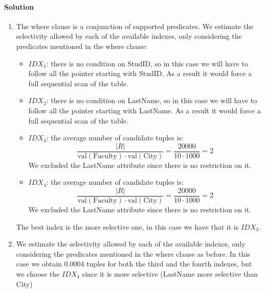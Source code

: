 \paragraph*{Solution}
\begin{enumerate}
    \item The where clause is a conjunction of supported predicates.
        We estimate the selectivity allowed by each of the available indexes, only considering the predicates mentioned in the where clause:
        \begin{itemize}
            \item $IDX_1$: there is no condition on StudID, so in this case we will have to follow all the pointer starting with StudID. 
                As a result it would force a full sequential scan of the table.
            \item $IDX_2$: there is no condition on LastName, so in this case we will have to follow all the pointer starting with LastName. 
                As a result it would force a full sequential scan of the table.
            \item $IDX_3$: the average number of candidate tuples is: 
                \[\dfrac{\left\lvert R \right\rvert }{\text{val}(\text{Faculty}) \cdot \text{val}(\text{City}) }=\dfrac{20000}{10 \cdot 1000}=2\]
                We excluded the LastName attribute since there is no restriction on it. 
            \item $IDX_4$: the average number of candidate tuples is: 
                \[\dfrac{\left\lvert R \right\rvert }{\text{val}(\text{Faculty}) \cdot \text{val}(\text{City}) }=\dfrac{20000}{10 \cdot 1000}=2\]
                We excluded the LastName attribute since there is no restriction on it. 
        \end{itemize}
        The best index is the more selective one, in this case we have that it is $IDX_3$. 
    \item We estimate the selectivity allowed by each of the available indexes, only considering the predicates mentioned in the where clause as before. 
        In this case we obtain 0.0004 tuples for both the third and the fourth indexes, but we choose the $IDX_4$ since it is more selective (LastName more selective than City)
\end{enumerate}